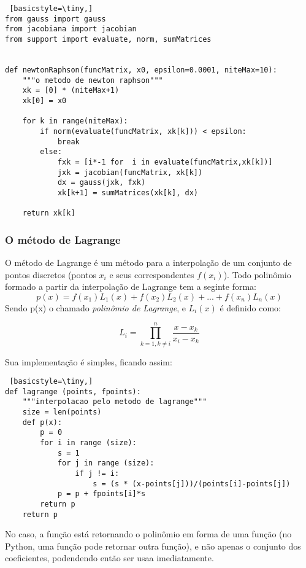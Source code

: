 \documentclass[12pt,A4]{report}
\begin{document}
\begin{lstlisting} [basicstyle=\tiny,]
from gauss import gauss
from jacobiana import jacobian
from support import evaluate, norm, sumMatrices


def newtonRaphson(funcMatrix, x0, epsilon=0.0001, niteMax=10):
    """o metodo de newton raphson"""
    xk = [0] * (niteMax+1)
    xk[0] = x0
    
    for k in range(niteMax):
        if norm(evaluate(funcMatrix, xk[k])) < epsilon:
            break
        else:
            fxk = [i*-1 for  i in evaluate(funcMatrix,xk[k])]
            jxk = jacobian(funcMatrix, xk[k])
            dx = gauss(jxk, fxk)
            xk[k+1] = sumMatrices(xk[k], dx)
    
    return xk[k]
\end{lstlisting}

\subsubsection{O método de Lagrange}
O método de Lagrange é um método para a interpolação de um conjunto de pontos discretos (pontos $x_i$ e seus correspondentes $f(x_i)$). Todo polinômio formado a partir da interpolação de Lagrange tem a seginte forma:
\begin{equation}
    p(x) = f(x_1)L_1(x) + f(x_2)L_2(x) + ... + f(x_n)L_n(x) 
\end{equation}
Sendo p(x) o chamado \textit{polinômio de Lagrange}, e $L_i(x)$ é definido como:

\begin{equation}
    L_i = \prod_{k=1, k\neq i}^{n} \frac{x-x_k}{x_i - x_k}
\end{equation}

Sua implementação é simples, ficando assim:

\begin{lstlisting} [basicstyle=\tiny,]
def lagrange (points, fpoints):
    """interpolacao pelo metodo de lagrange"""
    size = len(points)
    def p(x):
        p = 0
        for i in range (size):
            s = 1
            for j in range (size):
                if j != i:
                    s = (s * (x-points[j]))/(points[i]-points[j])
            p = p + fpoints[i]*s
        return p
    return p
\end{lstlisting}
No caso, a função está retornando o polinômio em forma de uma função (no Python, uma função pode retornar outra função), e não apenas o conjunto dos coeficientes, podendendo então ser usaa imediatamente.
\end{document}
